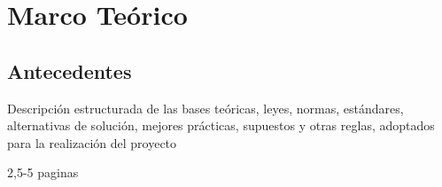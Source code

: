 \chapter{Marco Teórico}

\section{Antecedentes}


Descripción estructurada de las bases teóricas,
leyes, normas, estándares, alternativas de solución,
mejores prácticas, supuestos y otras reglas,
adoptados para la realización del proyecto

2,5-5 paginas